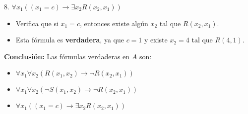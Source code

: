 \begin{solution}
8. \(\forall x_1 ((x_1 = c) \to \exists x_2 R(x_2, x_1))\)

\begin{itemize}
    \item Verifica que si \( x_1 = c \), entonces existe algún \( x_2 \) tal que \( R(x_2, x_1) \).
    \item Esta fórmula es \textbf{verdadera}, ya que \( c = 1 \) y existe \( x_2 = 4 \) tal que \( R(4, 1) \).
\end{itemize}

\textbf{Conclusión:}
Las fórmulas verdaderas en $A$ son:
\begin{itemize}
    \item $\forall x_1 \forall x_2 (R(x_1, x_2) \to \neg R(x_2, x_1))$
    \item $\forall x_1 \forall x_2 (\neg S(x_1, x_2) \to \neg R(x_2, x_1))$
    \item $\forall x_1 ((x_1 = c) \to \exists x_2 R(x_2, x_1))$
\end{itemize}

\end{solution}